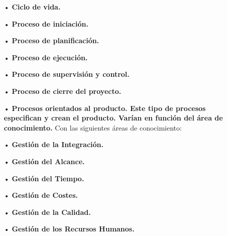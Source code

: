 \begin{itemize}
\item[•] \textbf{Ciclo de vida.}
\item[•] \textbf{Proceso de iniciación.}
\item[•] \textbf{Proceso de planificación.}
\item[•] \textbf{Proceso de ejecución.}
\item[•] \textbf{Proceso de supervisión y control.}
\item[•] \textbf{Proceso de cierre del proyecto.}
\item[•] \textbf{Procesos orientados al producto. Este tipo de procesos especifican y crean el producto. Varían en función del área de conocimiento.}
Con las siguientes áreas de conocimiento:

\item[•] \textbf{Gestión de la Integración.}
\item[•] \textbf{Gestión del Alcance.}
\item[•] \textbf{Gestión del Tiempo.}
\item[•] \textbf{Gestión de Costes.}
\item[•] \textbf{Gestión de la Calidad.}
\item[•] \textbf{Gestión de los Recursos Humanos.}
\end{itemize}
